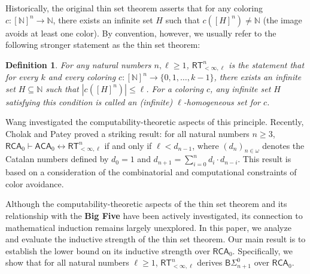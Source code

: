 \documentclass[10pt,reqno]{amsart}
\newtheorem{definition}[theorem]{Definition}
\numberwithin{equation}{section}
\begin{document}
Historically, the original thin set theorem asserts that for any coloring $c \colon [\mathbb{N}]^n \to \mathbb{N}$, there exists an infinite set $H$ such that $c([H]^n) \neq \mathbb{N}$ (the image avoids at least one color). By convention, however, we usually refer to the following stronger statement as the thin set theorem:


\begin{definition}
For any natural numbers $n, \ell \ge 1$, $\mathsf{RT}_{<\infty,\ell}^{n}$ is the statement that for every $k$ and every coloring $c \colon [\mathbb{N}]^n \to \{0,1,\dots,k-1\}$, there exists an infinite set $H \subseteq \mathbb{N}$ such that $|c([H]^n)| \le \ell$. For a coloring $c$, any infinite set $H$ satisfying this condition is called an (infinite) $\ell$-homogeneous set for $c$.
\end{definition}


Wang \cite{Wang} investigated the computability-theoretic aspects of this principle. Recently, Cholak and Patey \cite{Cholak-Patey} proved a striking result: for all natural numbers $n \ge 3$, $\mathsf{RCA}_0 \vdash \mathsf{ACA}_0 \leftrightarrow \mathsf{RT}_{<\infty,\ell}^{n}$ if and only if $\ell < d_{n-1}$, where $(d_n)_{n \in \omega}$ denotes the Catalan numbers defined by $d_0 = 1$ and $d_{n+1} = \sum_{i=0}^{n} d_i \cdot d_{n-i}$. This result is based on a consideration of the combinatorial and computational constraints of color avoidance.


Although the computability-theoretic aspects of the thin set theorem and its relationship with the \textbf{Big Five} have been actively investigated, its connection to mathematical induction remains largely unexplored. In this paper, we analyze and evaluate the inductive strength of the thin set theorem.
Our main result is to establish the lower bound on its inductive strength over $\mathsf{RCA}_0$. Specifically, we show that for all natural numbers $\ell\ge 1$, $\mathsf{RT}_{<\infty,\ell}^{n}$ derives $\mathsf{B}\Sigma_{n+1}^{0}$ over $\mathsf{RCA}_0$.
\end{document}

